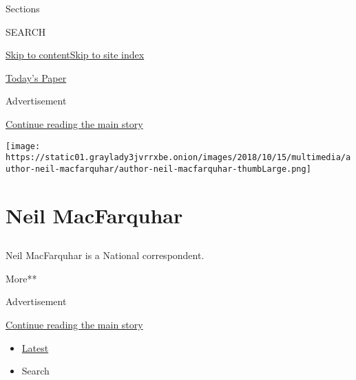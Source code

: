 Sections

SEARCH

\protect\hyperlink{site-content}{Skip to
content}\protect\hyperlink{site-index}{Skip to site index}

\href{https://myaccount.nytimes3xbfgragh.onion/auth/login?response_type=cookie\&client_id=vi}{}

\href{https://www.nytimes3xbfgragh.onion/section/todayspaper}{Today's
Paper}

Advertisement

\protect\hyperlink{after-top}{Continue reading the main story}

\texttt{[image: https://static01.graylady3jvrrxbe.onion/images/2018/10/15/multimedia/author-neil-macfarquhar/author-neil-macfarquhar-thumbLarge.png]}

\hypertarget{neil-macfarquhar}{%
\section{Neil MacFarquhar}\label{neil-macfarquhar}}

\subsection{}

Neil MacFarquhar is a National correspondent.

More**

Advertisement

\protect\hyperlink{after-mid1}{Continue reading the main story}

\begin{itemize}
\tightlist
\item
  \protect\hyperlink{stream-panel}{Latest}
\item
  Search
\end{itemize}

